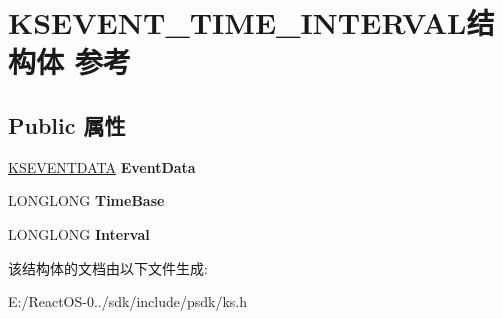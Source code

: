 \hypertarget{struct_k_s_e_v_e_n_t___t_i_m_e___i_n_t_e_r_v_a_l}{}\section{K\+S\+E\+V\+E\+N\+T\+\_\+\+T\+I\+M\+E\+\_\+\+I\+N\+T\+E\+R\+V\+A\+L结构体 参考}
\label{struct_k_s_e_v_e_n_t___t_i_m_e___i_n_t_e_r_v_a_l}
\subsection*{Public 属性}
\begin{DoxyCompactItemize}
\item 
\mbox{\label{struct_k_s_e_v_e_n_t___t_i_m_e___i_n_t_e_r_v_a_l_aa62fc5e8dd4b34709ff9742f1f36f9ad}} 
\hyperlink{struct_k_s_e_v_e_n_t_d_a_t_a}{K\+S\+E\+V\+E\+N\+T\+D\+A\+TA} {\bfseries Event\+Data}
\item 
\mbox{\label{struct_k_s_e_v_e_n_t___t_i_m_e___i_n_t_e_r_v_a_l_a57ee4698d8bdb3705951590c038ac21b}} 
L\+O\+N\+G\+L\+O\+NG {\bfseries Time\+Base}
\item 
\mbox{\label{struct_k_s_e_v_e_n_t___t_i_m_e___i_n_t_e_r_v_a_l_a6f91ab1972457e0dab0e3d1d5a4b22be}} 
L\+O\+N\+G\+L\+O\+NG {\bfseries Interval}
\end{DoxyCompactItemize}


该结构体的文档由以下文件生成\+:\begin{DoxyCompactItemize}
\item 
E\+:/\+React\+O\+S-\/0../sdk/include/psdk/ks.\+h\end{DoxyCompactItemize}
